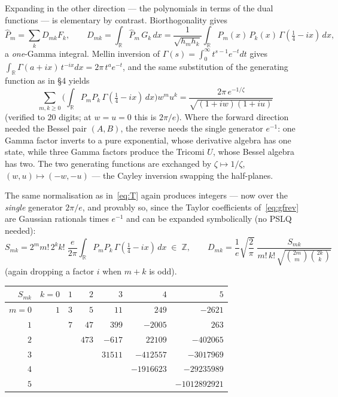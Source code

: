 \documentclass[11pt,a4paper]{article}
\newcommand{\R}{\mathbb{R}}
\newcommand{\Z}{\mathbb{Z}}
\begin{document}
Expanding in the other direction — the polynomials in terms of the
dual functions — is elementary by contrast. Biorthogonality gives
\[
  \widehat{P}_m = \sum_k D_{mk} F_k,
  \qquad
  D_{mk} = \int_\R \widehat{P}_m\, G_k\, dx
  = \frac{1}{\sqrt{h_m h_k}}
    \int_\R P_m(x)\, P_k(x)\, \Gamma(\tfrac14-ix)\, dx,
\]
a \emph{one}-Gamma integral. Mellin inversion of
$\Gamma(s) = \int_0^\infty t^{s-1} e^{-t} dt$ gives
$\int_\R \Gamma(a+ix)\, t^{-ix} dx = 2\pi\, t^a e^{-t}$, and the same
substitution of the generating function as in \S4 yields
\begin{equation}\label{eq:gfrev}
  \sum_{m,k \ge 0}
  \Big( \textstyle\int_\R P_m P_k\, \Gamma(\tfrac14-ix)\, dx \Big)
  w^m u^k
  = \frac{2\pi\, e^{-1/\zeta}}{\sqrt{(1+iw)(1+iu)}}
\end{equation}
(verified to $20$ digits; at $w=u=0$ this is $2\pi/e$). Where the
forward direction needed the Bessel pair $(A, B)$, the reverse needs
the single generator $e^{-1}$: one Gamma factor inverts to a pure
exponential, whose derivative algebra has one state, while three
Gamma factors produce the Tricomi $U$, whose Bessel algebra has two.
The two generating functions are exchanged by
$\zeta \mapsto 1/\zeta$, $(w,u) \mapsto (-w,-u)$ --- the Cayley
inversion swapping the half-planes.

The same normalisation as in~\eqref{eq:T} again produces integers ---
now over the \emph{single} generator $2\pi/e$, and provably so, since
the Taylor coefficients of~\eqref{eq:gfrev} are Gaussian rationals
times $e^{-1}$ and can be expanded symbolically (no PSLQ needed):
\[
  S_{mk} = 2^m m!\, 2^k k!\; \frac{e}{2\pi}
  \int_\R P_m P_k\, \Gamma(\tfrac14 - ix)\, dx \;\in\; \Z,
  \qquad
  D_{mk} = \frac{1}{e}\sqrt{\frac{2}{\pi}}\;
  \frac{S_{mk}}{m!\, k!\, \sqrt{\binom{2m}{m}\binom{2k}{k}}}
\]
(again dropping a factor $i$ when $m+k$ is odd).

\begin{table}[ht]
\centering
\small
\begin{tabular}{r|rrrrrr}
$S_{mk}$ & $k=0$ & $1$ & $2$ & $3$ & $4$ & $5$ \\
\hline
$m=0$ & $1$ & $3$ & $5$ & $11$ & $249$ & $-2621$ \\
$1$ &  & $7$ & $47$ & $399$ & $-2005$ & $263$ \\
$2$ &  &  & $473$ & $-617$ & $22109$ & $-402065$ \\
$3$ &  &  &  & $31511$ & $-412557$ & $-3017969$ \\
$4$ &  &  &  &  & $-1916623$ & $-29235989$ \\
$5$ &  &  &  &  &  & $-1012892921$ \\
\end{tabular}
\end{table}
\end{document}
